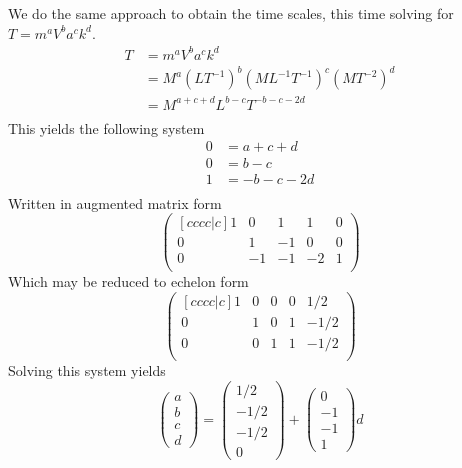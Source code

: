\documentclass[12pt]{article}
\begin{document}
We do the same approach to obtain the time scales, this time solving for
$T=m^aV^ba^ck^d$.
\begin{equation}
  \begin{aligned}
    T &= m^aV^ba^ck^d \\
    &= M^{a}(LT^{-1})^b(ML^{-1}T^{-1})^c(MT^{-2})^d \\
    &= M^{a+c+d}L^{b-c}T^{-b-c-2d} \\
  \end{aligned}
\end{equation}
This yields the following system
\begin{equation}
  \begin{aligned}
    0 &= a + c + d \\
    0 &= b - c \\
    1 &= -b  - c - 2d \\
  \end{aligned}
\end{equation}
Written in augmented matrix form
\begin{equation}
  \begin{pmatrix}[cccc|c]
    1 & 0 & 1 & 1 & 0 \\
    0 & 1 & -1 & 0 & 0 \\
    0 & -1 & -1 & -2 & 1 \\
  \end{pmatrix}
\end{equation}
Which may be reduced to echelon form
\begin{equation}
  \begin{pmatrix}[cccc|c]
    1 & 0 & 0 & 0 & 1/2 \\
    0 & 1 & 0 & 1 & -1/2 \\
    0 & 0 & 1 & 1 & -1/2 \\
  \end{pmatrix}
\end{equation}
Solving this system yields
\begin{equation}
  \begin{pmatrix}
    a \\ b \\ c \\ d
  \end{pmatrix} =
  \begin{pmatrix}
    1/2 \\ -1/2 \\ -1/2 \\ 0
  \end{pmatrix} +
  \begin{pmatrix}
    0 \\ -1 \\ -1 \\ 1
  \end{pmatrix}
  d
\end{equation}
\end{document}

